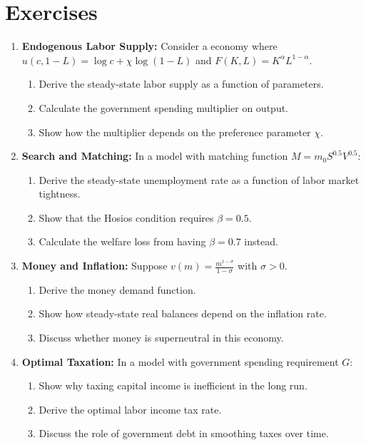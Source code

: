 \documentclass[\topdir/lecture\_notes.tex]{subfiles}
\begin{document}
\section{Exercises}

\begin{enumerate}
\item \textbf{Endogenous Labor Supply:} Consider a economy where $u(c, 1-L) = \log c + \chi \log(1-L)$ and $F(K,L) = K^\alpha L^{1-\alpha}$.
\begin{enumerate}
\item Derive the steady-state labor supply as a function of parameters.
\item Calculate the government spending multiplier on output.
\item Show how the multiplier depends on the preference parameter $\chi$.
\end{enumerate}

\item \textbf{Search and Matching:} In a model with matching function $M = m_0 S^{0.5} V^{0.5}$:
\begin{enumerate}
\item Derive the steady-state unemployment rate as a function of labor market tightness.
\item Show that the Hosios condition requires $\beta = 0.5$.
\item Calculate the welfare loss from having $\beta = 0.7$ instead.
\end{enumerate}

\item \textbf{Money and Inflation:} Suppose $v(m) = \frac{m^{1-\sigma}}{1-\sigma}$ with $\sigma > 0$.
\begin{enumerate}
\item Derive the money demand function.
\item Show how steady-state real balances depend on the inflation rate.
\item Discuss whether money is superneutral in this economy.
\end{enumerate}

\item \textbf{Optimal Taxation:} In a model with government spending requirement $G$:
\begin{enumerate}
\item Show why taxing capital income is inefficient in the long run.
\item Derive the optimal labor income tax rate.
\item Discuss the role of government debt in smoothing taxes over time.
\end{enumerate}
\end{enumerate}
\end{document}
